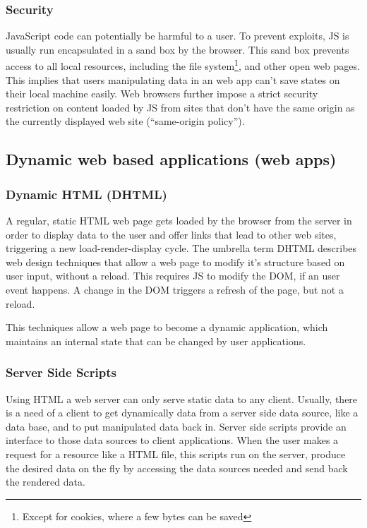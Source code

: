 
\subsubsection{Security}
JavaScript code can potentially be harmful to a user.
To prevent exploits, JS is usually run encapsulated in a sand box by the browser.
This sand box prevents access to all local resources, including the file system\footnote{Except for cookies, where a few bytes can be saved}, and other open web pages.
This implies that users manipulating data in an web app can't save states on their local machine easily.
Web browsers further impose a strict security restriction on content loaded by JS from sites that don't have the same origin as the currently displayed web site (``same-origin policy'').


\subsection{Dynamic web based applications (web apps)}
\label{sec:webapps}
\subsubsection{Dynamic HTML (DHTML)}
\label{DHTML}

A regular, static HTML web page gets loaded by the browser from the server in order to display data to the user and offer links that lead to other web sites, triggering a new load-render-display cycle.
The umbrella term DHTML describes web design techniques that allow a web page to modify it's structure based on user input, without a reload.
This requires JS to modify the DOM, if an user event happens.
A change in the DOM triggers a refresh of the page, but not a reload.

This techniques allow a web page to become a dynamic application, which maintains an internal state that can be changed by user applications.


\subsubsection{Server Side Scripts}
\label{sec:serverside}

Using HTML a web server can only serve static data to any client.
Usually, there is a need of a client to get dynamically data from a server side data source, like a data base, and to put manipulated data back in.
Server side scripts provide an interface to those data sources to client applications.
When the user makes a request for a resource like a HTML file, this scripts run on the server, produce the desired data on the fly by accessing the data sources needed and send back the rendered data.

